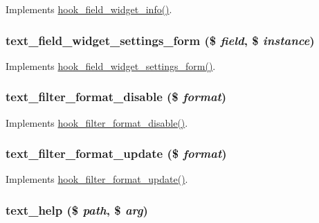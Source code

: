 \label{text_8module_aacf1cec61c2dbad31fb5ab8a1ee98085}
Implements \hyperlink{group__field__widget_gac53aa6c2a4ac1215660d25b5d7f20792}{hook\_\-field\_\-widget\_\-info()}. \hypertarget{text_8module_a147e56b0fdbe7e08da652c5ae64c8a0f}{
\subsubsection[{text\_\-field\_\-widget\_\-settings\_\-form}]{\setlength{\rightskip}{0pt plus 5cm}text\_\-field\_\-widget\_\-settings\_\-form (\$ {\em field}, \/  \$ {\em instance})}}
\label{text_8module_a147e56b0fdbe7e08da652c5ae64c8a0f}
Implements \hyperlink{group__field__types_gabe5ece2134d0cbdfc3c4793f24c5866c}{hook\_\-field\_\-widget\_\-settings\_\-form()}. \hypertarget{text_8module_a69f8b21fdab6c273c1b3825de83eb2de}{
\subsubsection[{text\_\-filter\_\-format\_\-disable}]{\setlength{\rightskip}{0pt plus 5cm}text\_\-filter\_\-format\_\-disable (\$ {\em format})}}
\label{text_8module_a69f8b21fdab6c273c1b3825de83eb2de}
Implements \hyperlink{group__hooks_gae4873bf6d76c33475296917d304719e9}{hook\_\-filter\_\-format\_\-disable()}. \hypertarget{text_8module_a8b955b60415b2f9473046fb92c1c9157}{
\subsubsection[{text\_\-filter\_\-format\_\-update}]{\setlength{\rightskip}{0pt plus 5cm}text\_\-filter\_\-format\_\-update (\$ {\em format})}}
\label{text_8module_a8b955b60415b2f9473046fb92c1c9157}
Implements \hyperlink{group__hooks_gaf9e4490f3ca224c161481754a3332c92}{hook\_\-filter\_\-format\_\-update()}. \hypertarget{text_8module_ada236d36b8e686509f3de37cb66a1187}{
\subsubsection[{text\_\-help}]{\setlength{\rightskip}{0pt plus 5cm}text\_\-help (\$ {\em path}, \/  \$ {\em arg})}}
